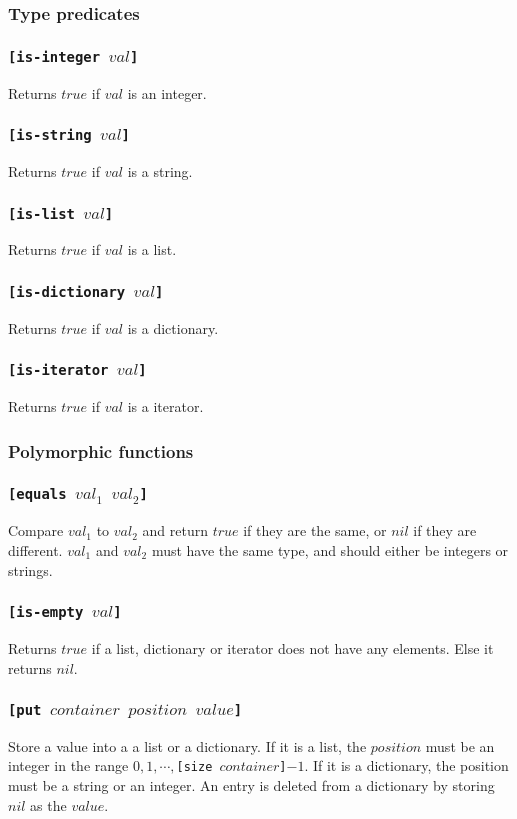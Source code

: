 \documentclass[11pt]{report}
\begin{document}
\subsubsection{Type predicates}
\subsubsection*{\tt{[is-integer }$val$\tt{]}}
Returns $true$ if $val$ is an integer.
\subsubsection*{\tt{[is-string }$val$\tt{]}}
Returns $true$ if $val$ is a string.
\subsubsection*{\tt{[is-list }$val$\tt{]}}
Returns $true$ if $val$ is a list.
\subsubsection*{\tt{[is-dictionary }$val$\tt{]}}
Returns $true$ if $val$ is a dictionary.
\subsubsection*{\tt{[is-iterator }$val$\tt{]}}
Returns $true$ if $val$ is a iterator.

\subsubsection{Polymorphic functions}
\subsubsection*{\tt{[equals }$val_1$ $val_2$\tt{]}}
Compare $val_1$ to $val_2$ and return $true$ if they are the same, or $nil$ if they are different. $val_1$ and $val_2$ must have the same type, and should either be integers or strings.
\subsubsection*{\tt{[is-empty }$val$\tt{]}}
Returns $true$ if a list, dictionary or iterator does not have any elements. Else it returns $nil$.
\subsubsection*{\tt{[put }$container$ $position$ $value$\tt{]}}
Store a value into a a list or a dictionary. If it is a list, the $position$ must be an integer in the range $0,1, \cdots, ${\tt{[size }}$container${\tt{]}}$-1$.
If it is a dictionary, the position must be a string or an integer. An entry is deleted from a dictionary by storing $nil$ as the $value$.
\end{document}
